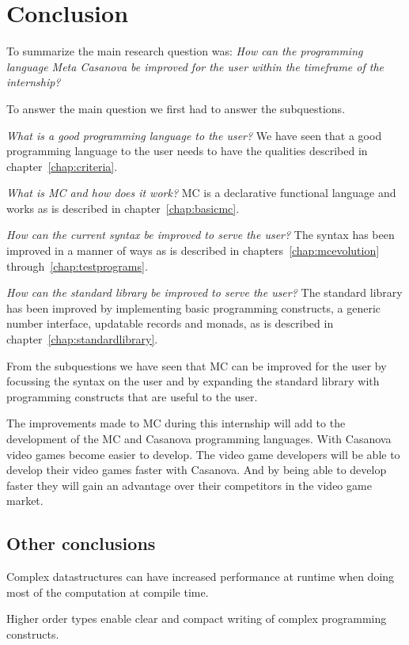 \chapter{Conclusion}
To summarize the main research question was:
\emph{How can the programming language Meta Casanova be improved for the user within the timeframe of the internship?}

To answer the main question we first had to answer the subquestions.

\emph{What is a good programming language to the user?}
We have seen that a good programming language to the user needs to have the qualities described in chapter~\ref{chap:criteria}.

\emph{What is MC and how does it work?}
MC is a declarative functional language and works as is described in chapter~\ref{chap:basicmc}.

\emph{How can the current syntax be improved to serve the user?}
The syntax has been improved in a manner of ways as is described in chapters~\ref{chap:mcevolution} through~\ref{chap:testprograms}.

\emph{How can the standard library be improved to serve the user?}
The standard library has been improved by implementing basic programming constructs, a generic number interface, updatable records and monads, as is described in chapter~\ref{chap:standardlibrary}.

From the subquestions we have seen that MC can be improved for the user by focussing the syntax on the user and by expanding the standard library with programming constructs that are useful to the user.

The improvements made to MC during this internship will add to the development of the MC and Casanova programming languages.
With Casanova video games become easier to develop.
The video game developers will be able to develop their video games faster with Casanova.
And by being able to develop faster they will gain an advantage over their competitors in the video game market.



\section{Other conclusions}
Complex datastructures can have increased performance at runtime when doing most of the computation at compile time.

Higher order types enable clear and compact writing of complex programming constructs.

